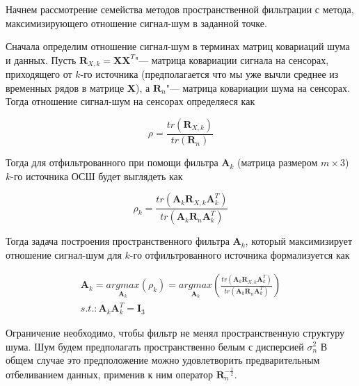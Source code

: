 Начнем рассмотрение семейства методов пространственной фильтрации с метода, максимизирующего
отношение сигнал-шум в заданной точке.

Сначала определим отношение сигнал-шум в терминах матриц ковариаций шума и данных.
Пусть $\mathbf{R}_{X,k} = \mathbf{X}\mathbf{X}^T$"--- матрица ковариации сигнала на сенсорах,
приходящего от $k$-го источника
(предполагается что мы уже вычли среднее из временных рядов в матрице $\mathbf{X}$),
а $\mathbf{R}_n$"--- матрица ковариации шума на сенсорах. Тогда отношение
сигнал-шум на сенсорах определяеся как

\begin{equation}
    \rho = \frac{tr(\mathbf{R}_{X,k})}{tr(\mathbf{R}_n)}
\end{equation}

Тогда для отфильтрованного  при помощи фильтра $\mathbf{A}_k$
(матрица размером $m \times 3$) $k$-го источника ОСШ будет выглядеть как

\begin{equation}
    \rho_k = \frac{tr(\mathbf{A}_k \mathbf{R}_{X,k} \mathbf{A}_k^T)}{tr(\mathbf{A}_k \mathbf{R}_n \mathbf{A}_k^T)}
\end{equation}

Тогда задача построения пространственного фильтра $\mathbf{A}_k$,
который максимизирует отношение сигнал-шум
для $k$-го отфильтрованного источника формализуется как

\begin{gather}
    \mathbf{A}_k = \underset{\mathbf{A}_k}{argmax}(\rho_k) =
    \underset{\mathbf{A}_k}{argmax}\left(
        \frac{tr(\mathbf{A}_k \mathbf{R}_{X,k} \mathbf{A}_k^T)}
             {tr(\mathbf{A}_k \mathbf{R}_n \mathbf{A}_k^T)}
         \right)\\
    \label{max_snr_objective}
    s.t.: \mathbf{A}_k\mathbf{A}_k^T = \mathbf{I}_3
\end{gather}

Ограничение необходимо, чтобы фильтр не менял пространственную структуру шума.
Шум будем предполагать пространственно белым с дисперсией $\sigma^2_n$
В общем случае это предположение можно удовлетворить
предварительным отбеливанием данных, применив к ним
оператор $\mathbf{R}_n^{-\frac{1}{2}}$.


